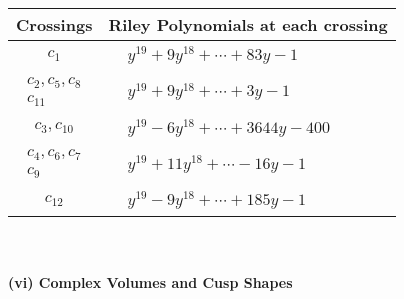 \documentclass[1p]{elsarticle_modified}
\theoremstyle{definition}
\begin{document}
\begin{tabular}{m{50pt}|m{274pt}}
Crossings & \hspace{64pt}Riley Polynomials at each crossing \\
\hline $$\begin{aligned}c_{1}\end{aligned}$$&$\begin{aligned}
&y^{19}+9 y^{18}+\cdots+83 y-1
\end{aligned}$\\
\hline $$\begin{aligned}c_{2},c_{5},c_{8}\\c_{11}\end{aligned}$$&$\begin{aligned}
&y^{19}+9 y^{18}+\cdots+3 y-1
\end{aligned}$\\
\hline $$\begin{aligned}c_{3},c_{10}\end{aligned}$$&$\begin{aligned}
&y^{19}-6 y^{18}+\cdots+3644 y-400
\end{aligned}$\\
\hline $$\begin{aligned}c_{4},c_{6},c_{7}\\c_{9}\end{aligned}$$&$\begin{aligned}
&y^{19}+11 y^{18}+\cdots-16 y-1
\end{aligned}$\\
\hline $$\begin{aligned}c_{12}\end{aligned}$$&$\begin{aligned}
&y^{19}-9 y^{18}+\cdots+185 y-1
\end{aligned}$\\
\hline
\end{tabular}\\~\\
\newpage\flushleft \textbf{(vi) Complex Volumes and Cusp Shapes}
\end{document}
